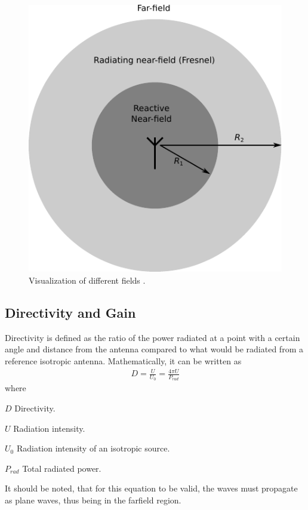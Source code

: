 \begin{figure}[htbp]
  \centering
  \includegraphics[scale=1]{img/analysis/radiationfields}
  \caption{Visualization of different fields \cite{balanis2012antenna}.}
  \label{fig:field-regions}
\end{figure}

\subsection{Directivity and Gain}
\label{subsec:dir_gain}
Directivity is defined as the ratio of the power radiated at a point with a certain angle and distance from the antenna compared to what would be radiated from a reference isotropic antenna. Mathematically, it can be written as \cite{balanis2012antenna}
\begin{align} %
  D = \frac{U}{U_0} = \frac{4 \pi U}{P_{rad}} 
\end{align}
where
\begin{where}
  \item[$D$] Directivity.
  \item[$U$] Radiation intensity.
  \item[$U_0$] Radiation intensity of an isotropic source.
  \item[$P_{rad}$] Total radiated power.
\end{where}
It should be noted, that for this equation to be valid, the waves must propagate as plane waves, thus being in the farfield region.

